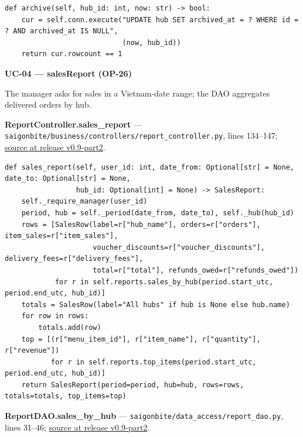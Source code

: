 \begin{lstlisting}
def archive(self, hub_id: int, now: str) -> bool:
    cur = self.conn.execute("UPDATE hub SET archived_at = ? WHERE id = ? AND archived_at IS NULL",
                            (now, hub_id))
    return cur.rowcount == 1
\end{lstlisting}
\textbf{UC-04 --- salesReport (OP-26)}

The manager asks for sales in a Vietnam-date range; the DAO aggregates delivered orders by hub.

\textbf{ReportController.sales\_report} --- \texttt{saigonbite/\allowbreak{}business/\allowbreak{}controllers/\allowbreak{}report\_\allowbreak{}controller.\allowbreak{}py}, lines 134--147; \href{\TargetRepo\detokenize{/blob/v0.9-part2/saigonbite/business/controllers/report_controller.py#L134-L147}}{source at release v0.9-part2}.

\begin{lstlisting}
def sales_report(self, user_id: int, date_from: Optional[str] = None, date_to: Optional[str] = None,
                 hub_id: Optional[int] = None) -> SalesReport:
    self._require_manager(user_id)
    period, hub = self._period(date_from, date_to), self._hub(hub_id)
    rows = [SalesRow(label=r["hub_name"], orders=r["orders"], item_sales=r["item_sales"],
                     voucher_discounts=r["voucher_discounts"], delivery_fees=r["delivery_fees"],
                     total=r["total"], refunds_owed=r["refunds_owed"])
            for r in self.reports.sales_by_hub(period.start_utc, period.end_utc, hub_id)]
    totals = SalesRow(label="All hubs" if hub is None else hub.name)
    for row in rows:
        totals.add(row)
    top = [(r["menu_item_id"], r["item_name"], r["quantity"], r["revenue"])
           for r in self.reports.top_items(period.start_utc, period.end_utc, hub_id)]
    return SalesReport(period=period, hub=hub, rows=rows, totals=totals, top_items=top)
\end{lstlisting}
\textbf{ReportDAO.sales\_by\_hub} --- \texttt{saigonbite/\allowbreak{}data\_\allowbreak{}access/\allowbreak{}report\_\allowbreak{}dao.\allowbreak{}py}, lines 31--46; \href{\TargetRepo\detokenize{/blob/v0.9-part2/saigonbite/data_access/report_dao.py#L31-L46}}{source at release v0.9-part2}.

